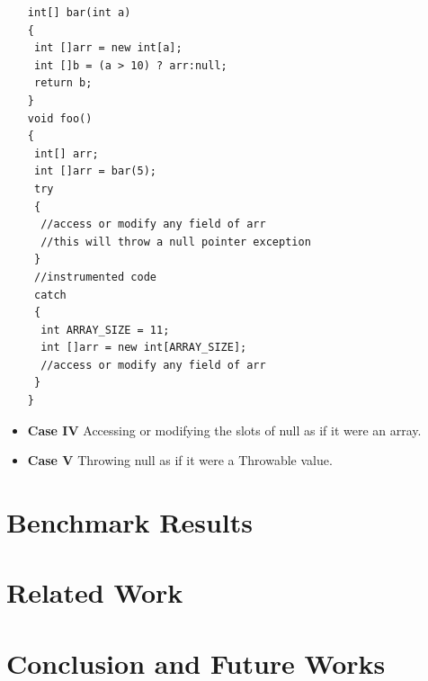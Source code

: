 \documentclass{sigplanconf}
\begin{document}
\begin{itemize}
  \lstset{language=Java, caption=array null pointer exception,
  label=patchingexample2}

\begin{lstlisting}
int[] bar(int a)
{
 int []arr = new int[a];
 int []b = (a > 10) ? arr:null;
 return b; 
}
void foo()
{
 int[] arr;
 int []arr = bar(5);
 try
 {
  //access or modify any field of arr
  //this will throw a null pointer exception
 }
 //instrumented code
 catch
 {
  int ARRAY_SIZE = 11;
  int []arr = new int[ARRAY_SIZE];
  //access or modify any field of arr
 }
}
\end{lstlisting}
  \item \textbf{Case IV} Accessing or modifying the slots of null as if it were
  an array.
 
  \item \textbf{Case V} Throwing null as if it were a Throwable value.
\end{itemize}



\section{Benchmark Results}
\label{sec:bench}

\section{Related Work}
\label{sec:rel}

\section{Conclusion and Future Works}
\label{sec:conc}


\acks










\end{document}
